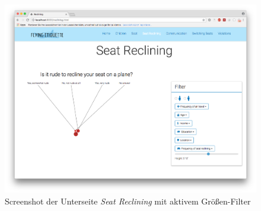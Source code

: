 \documentclass{mi-seminar}
\begin{document}
\begin{figure}
\includegraphics[scale=0.5]{assets/filter_seat_active.png}
\caption{Screenshot der Unterseite \textit{Seat Reclining} mit aktivem Grö{\ss}en-Filter}
\label{ScSeatRecliningActive}
\end{figure}
\end{document}
